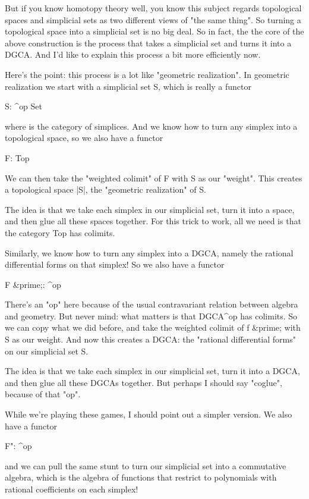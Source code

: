 But if you know homotopy theory well, you know this subject regards
topological spaces and simplicial sets as two different views of
"the same thing".  So turning a topological space into a
simplicial set is no big deal.  So in fact, the the core of the above
construction is the process that takes a simplicial set and turns it
into a DGCA.  And I'd like to explain this process a bit more
efficiently now.

Here's the point: this process is a lot like "geometric realization".
In geometric realization we start with a simplicial set S, which is 
really a functor

S: \Delta ^{op} \to  Set

where \Delta  is the category of simplices.  And we know how to turn
any simplex into a topological space, so we also have a functor

F: \Delta  \to  Top

We can then take the "weighted colimit" of F with S as our
"weight".  This creates a topological space |S|, the
"geometric realization" of S.

The idea is that we take each simplex in our simplicial set, turn
it into a space, and then glue all these spaces together.  For this
trick to work, all we need is that the category Top has colimits.

Similarly, we know how to turn any simplex into a DGCA, namely the
rational differential forms on that simplex!  So we also have a
functor

F &prime;: \Delta  \to  [DGCAs]^{op}

There's an "op" here because of the usual contravariant relation
between algebra and geometry.  But never mind: what matters is that
DGCA^{op} has colimits.  So we can copy what we did before, and take
the weighted colimit of f &prime; with S as our weight.  And now this creates 
a DGCA: the "rational differential forms" on our simplicial set S.

The idea is that we take each simplex in our simplicial set, turn
it into a DGCA, and then glue all these DGCAs together.  But perhaps
I should say "coglue", because of that "op".

While we're playing these games, I should point out a simpler version.
We also have a functor

F": \Delta  {}^{op}

and we can pull the same stunt to turn our simplicial set into a 
commutative algebra, which is the algebra of functions that restrict
to polynomials with rational coefficients on each simplex!

